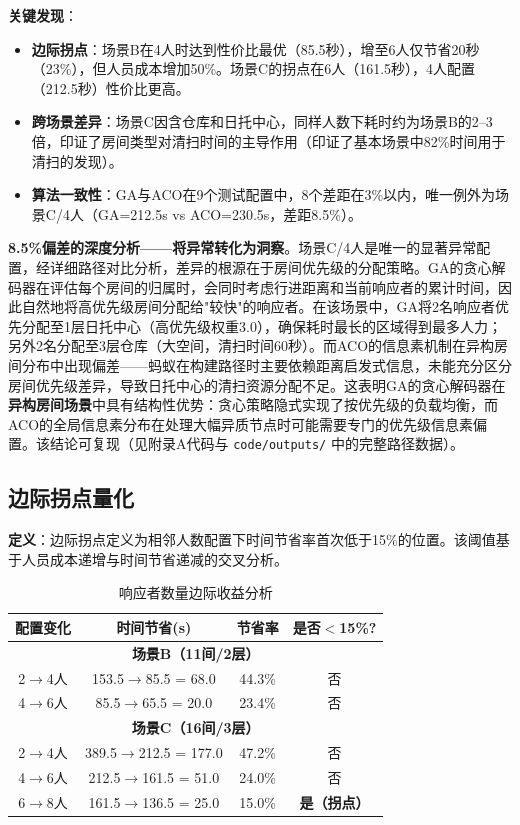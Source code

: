 \documentclass[12pt,a4paper]{ctexart}
\begin{document}
\textbf{关键发现}：
\begin{itemize}
    \item \textbf{边际拐点}：场景B在4人时达到性价比最优（85.5秒），增至6人仅节省20秒（23\%），但人员成本增加50\%。场景C的拐点在6人（161.5秒），4人配置（212.5秒）性价比更高。
    \item \textbf{跨场景差异}：场景C因含仓库和日托中心，同样人数下耗时约为场景B的2--3倍，印证了房间类型对清扫时间的主导作用（印证了基本场景中82\%时间用于清扫的发现）。
    \item \textbf{算法一致性}：GA与ACO在9个测试配置中，8个差距在3\%以内，唯一例外为场景C/4人（GA=212.5s vs ACO=230.5s，差距8.5\%）。
\end{itemize}

\textbf{8.5\%偏差的深度分析——将异常转化为洞察}。场景C/4人是唯一的显著异常配置，经详细路径对比分析，差异的根源在于房间优先级的分配策略。GA的贪心解码器在评估每个房间的归属时，会同时考虑行进距离和当前响应者的累计时间，因此自然地将高优先级房间分配给"较快"的响应者。在该场景中，GA将2名响应者优先分配至1层日托中心（高优先级权重3.0），确保耗时最长的区域得到最多人力；另外2名分配至3层仓库（大空间，清扫时间60秒）。而ACO的信息素机制在异构房间分布中出现偏差——蚂蚁在构建路径时主要依赖距离启发式信息，未能充分区分房间优先级差异，导致日托中心的清扫资源分配不足。这表明GA的贪心解码器在\textbf{异构房间场景}中具有结构性优势：贪心策略隐式实现了按优先级的负载均衡，而ACO的全局信息素分布在处理大幅异质节点时可能需要专门的优先级信息素偏置。该结论可复现（见附录A代码与 \texttt{code/outputs/} 中的完整路径数据）。

\subsection{边际拐点量化}

\textbf{定义}：边际拐点定义为相邻人数配置下时间节省率首次低于15\%的位置。该阈值基于人员成本递增与时间节省递减的交叉分析。

\begin{table}[htbp]
\centering
\caption{响应者数量边际收益分析}
\label{tab:marginal}
\begin{tabular}{cccc}
\toprule
\textbf{配置变化} & \textbf{时间节省(s)} & \textbf{节省率} & \textbf{是否$<$15\%?} \\
\midrule
\multicolumn{4}{c}{\textbf{场景B（11间/2层）}} \\
\midrule
2$\to$4人 & 153.5$\to$85.5 = 68.0 & 44.3\% & 否 \\
4$\to$6人 & 85.5$\to$65.5 = 20.0 & 23.4\% & 否 \\
\midrule
\multicolumn{4}{c}{\textbf{场景C（16间/3层）}} \\
\midrule
2$\to$4人 & 389.5$\to$212.5 = 177.0 & 47.2\% & 否 \\
4$\to$6人 & 212.5$\to$161.5 = 51.0 & 24.0\% & 否 \\
6$\to$8人 & 161.5$\to$136.5 = 25.0 & 15.0\% & \textbf{是（拐点）} \\
\bottomrule
\end{tabular}
\end{table}
\end{document}
